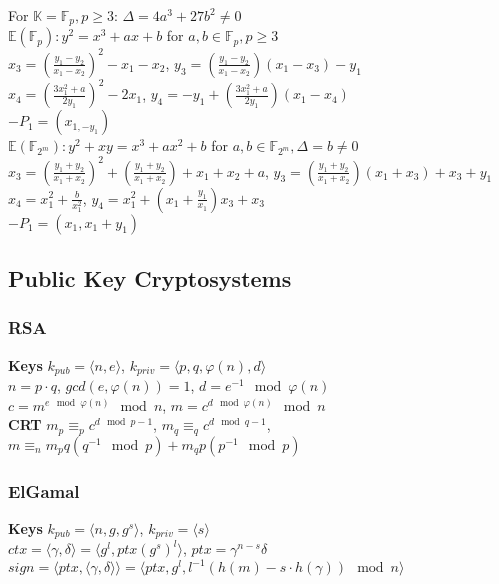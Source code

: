 \documentclass[twoside, 11pt]{article}
\begin{document}
            For $\mathds{K} = \mathds{F}_{p}, p \ge 3$: $\varDelta = 4a^{3} + 27b^{2} \neq 0$ \\
            $\mathds{E}(\mathds{F}_{p}): y^{2} = x^{3} + ax + b$ for $a, b \in \mathds{F}_{p}, p \ge 3$ \\
            $x_{3}=(\frac{y_{1}- y_{2}}{x_{1}-x_{2}})^{2} - x_{1} - x_{2}$, $y_{3} = (\frac{y_{1}-y_{2}}{x_{1}-x_{2}})(x_{1}-x_{3})-y_{1}$ \\
            $x_{4}=(\frac{3x_{1}^{2}+a}{2y_{1}})^{2}-2x_{1}$, $y_{4} = -y_{1}+(\frac{3x_{1}^{2}+a}{2y_{1}})(x_{1}-x_{4})$ \\
            $-P_{1} = (x_{1, -y_{1}})$ \\
            
            $\mathds{E}(\mathds{F}_{2^{m}}) : y^{2} + xy = x^{3} + ax^{2} + b$ for $a, b \in \mathds{F}_{2^{m}}, \varDelta = b\neq 0$ \\
            $x_{3}= (\frac{y_{1}+y_{2}}{x_{1}+x_{2}})^{2} + (\frac{y_{1}+y_{2}}{x_{1}+x_{2}}) + x_{1} + x_{2} + a$, $y_{3} = (\frac{y_{1}+y_{2}}{x_{1}+x_{2}})(x_{1}+ x_{3})+x_{3}+ y_{1}$ \\
            $x_{4} = x_{1}^{2}+\frac{b}{x_{1}^{2}}$, $y_{4}=x_{1}^{2}+(x_{1}+ \frac{y_{1}}{x_{1}})x_{3} + x_{3}$ \\
            $-P_{1} = (x_{1}, x_{1}+ y_{1})$\\

        \subsection*{Public Key Cryptosystems}
            \subsubsection*{RSA}
                \textbf{Keys} $k_{pub} = \langle n, e\rangle$, $k_{priv}=\langle p, q, \varphi(n), d\rangle$ \\
                $n=p\cdot q$, $gcd(e, \varphi(n))=1$, $d=e^{-1}\mod{\varphi(n)}$ \\
                $c=m^{e \mod{\varphi(n)}} \mod{n}$, $m=c^{d \mod{\varphi(n)}} \mod{n}$ \\
                \textbf{CRT} $m_{p} \equiv_{p} c^{d \mod{p-1}}$, $m_{q} \equiv_{q} c^{d \mod{q-1}}$, $m \equiv_{n} m_{p}q(q^{-1}\mod{p}) + m_{q}p(p^{-1}\mod{p})$

            \subsubsection*{ElGamal}
                \textbf{Keys} $k_{pub}=\langle n, g, g^{s}\rangle$, $k_{priv}=\langle s\rangle$ \\
                $ctx = \langle \gamma, \delta\rangle = \langle g^{l}, ptx(g^{s})^{l}\rangle$, $ptx = \gamma^{n-s}\delta$ \\
                $sign = \langle ptx, \langle \gamma, \delta\rangle\rangle = \langle ptx, g^{l}, l^{-1}(h(m)-s\cdot h(\gamma))\mod{n}\rangle$
\end{document}
